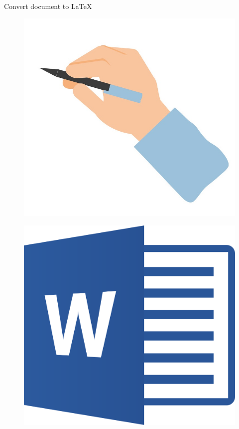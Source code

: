 \documentclass[aspectratio=169]{beamer}
\begin{document}
\begin{frame}{Convert document to \LaTeX}

    \begin{minipage}[t]{0.25\linewidth}
        \begin{figure}
            \includegraphics[height=0.2\textheight, keepaspectratio]{image/image1.jpg}
        \end{figure}
        \vspace{0.1cm}
        \begin{figure}
            \includegraphics[height=0.2\textheight, keepaspectratio]{image/image2.png}

\end{figure}
\end{minipage}
\end{frame}
\end{document}
